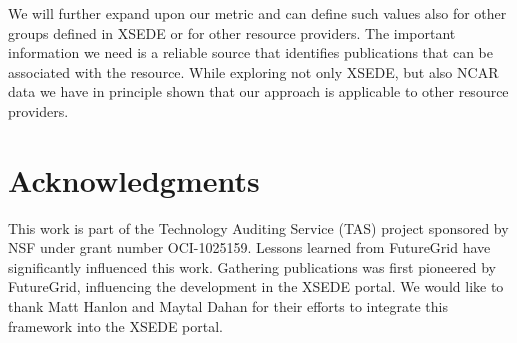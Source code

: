 \documentclass[10pt, conference, compsocconf]{IEEEtran}
\begin{document}
We will further expand upon our metric and can define such values also for other groups defined in XSEDE or for other resource providers. The important information we need is a reliable source that identifies publications that can be associated with the resource. While exploring not only XSEDE, but also NCAR data we have in principle shown that our approach is applicable to other resource providers.






\section{Acknowledgments}

 
This work is part of the Technology Auditing Service (TAS) project sponsored by NSF under grant number OCI-1025159. Lessons learned from FutureGrid have significantly influenced this work. Gathering publications was first pioneered by FutureGrid, influencing the development in the XSEDE portal. We would like to thank Matt Hanlon and Maytal Dahan for their efforts to integrate this framework into the XSEDE portal. 
\end{document}
